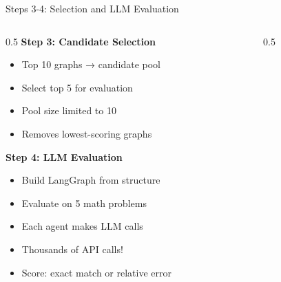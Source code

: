 \documentclass[aspectratio=169]{beamer}
\begin{document}
\begin{frame}{Steps 3-4: Selection and LLM Evaluation}
    \begin{columns}[T]
        \begin{column}{0.5\textwidth}
            \textbf{Step 3: Candidate Selection}
            \begin{itemize}
                \item Top 10 graphs → candidate pool
                \item Select top 5 for evaluation
                \item Pool size limited to 10
                \item Removes lowest-scoring graphs
            \end{itemize}
            
            \vspace{0.5cm}
            \textbf{Step 4: LLM Evaluation}
            \begin{itemize}
                \item Build LangGraph from structure
                \item Evaluate on 5 math problems
                \item Each agent makes LLM calls
                \item \alert{Thousands of API calls!}
                \item Score: exact match or relative error
            \end{itemize}
        \end{column}
        \begin{column}{0.5\textwidth}
\end{column}
\end{columns}
\end{frame}
\end{document}
